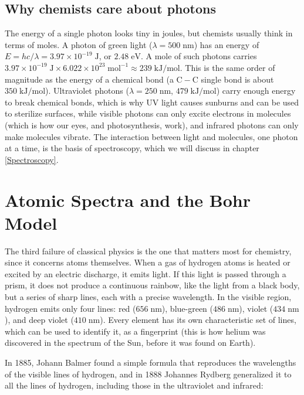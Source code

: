 \documentclass[
  english,
  9pt,
]{extbook}
\theoremstyle{definition}
\theoremstyle{definition}
\theoremstyle{definition}
\theoremstyle{definition}
\theoremstyle{remark}
\begin{document}
\subsection{Why chemists care about photons}\label{why-chemists-care-about-photons}

The energy of a single photon looks tiny in joules, but chemists usually think in terms of moles. A photon of green light (\(\lambda=500\;\text{nm}\)) has an energy of \(E=hc/\lambda=3.97\times10^{-19}\;\text{J}\), or \(2.48\;\text{eV}\). A mole of such photons carries \(3.97\times10^{-19}\;\text{J}\times6.022\times10^{23}\;\text{mol}^{-1}\approx239\;\text{kJ/mol}\). This is the same order of magnitude as the energy of a chemical bond (a \(\mathrm{C}-\mathrm{C}\) single bond is about \(350\;\text{kJ/mol}\)). Ultraviolet photons (\(\lambda=250\;\text{nm}\), \(479\;\text{kJ/mol}\)) carry enough energy to break chemical bonds, which is why UV light causes sunburns and can be used to sterilize surfaces, while visible photons can only excite electrons in molecules (which is how our eyes, and photosynthesis, work), and infrared photons can only make molecules vibrate. The interaction between light and molecules, one photon at a time, is the basis of spectroscopy, which we will discuss in chapter \ref{Spectroscopy}.

\section{Atomic Spectra and the Bohr Model}\label{atomic-spectra-and-the-bohr-model}

The third failure of classical physics is the one that matters most for chemistry, since it concerns atoms themselves. When a gas of hydrogen atoms is heated or excited by an electric discharge, it emits light. If this light is passed through a prism, it does not produce a continuous rainbow, like the light from a black body, but a series of sharp lines, each with a precise wavelength. In the visible region, hydrogen emits only four lines: red (\(656\;\text{nm}\)), blue-green (\(486\;\text{nm}\)), violet (\(434\;\text{nm}\)), and deep violet (\(410\;\text{nm}\)). Every element has its own characteristic set of lines, which can be used to identify it, as a fingerprint (this is how helium was discovered in the spectrum of the Sun, before it was found on Earth).

In 1885, Johann Balmer found a simple formula that reproduces the wavelengths of the visible lines of hydrogen, and in 1888 Johannes Rydberg generalized it to all the lines of hydrogen, including those in the ultraviolet and infrared:
\end{document}

